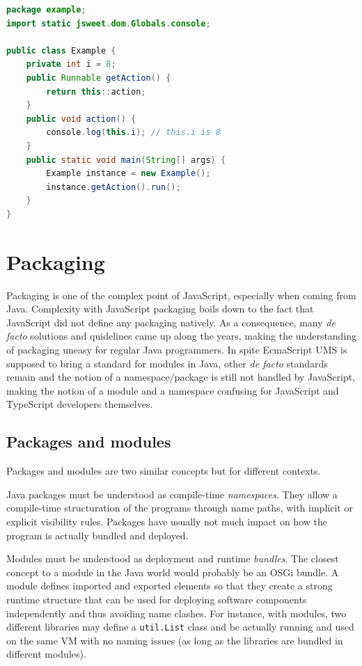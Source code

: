 \documentclass[a4paper]{report}
\begin{document}
\begin{lstlisting}[language=Java]
package example;
import static jsweet.dom.Globals.console;

public class Example {
	private int i = 8;
	public Runnable getAction() {
		return this::action;
	}
	public void action() {
		console.log(this.i); // this.i is 8
	}
	public static void main(String[] args) {
		Example instance = new Example();
		instance.getAction().run();
	}
}
\end{lstlisting}

\chapter{Packaging}
\label{packaging}

Packaging is one of the complex point of JavaScript, especially when coming from Java. Complexity with JavaScript packaging boils down to the fact that JavaScript did not define any packaging natively. As a consequence, many \emph{de facto} solutions and quidelines came up along the years, making the understanding of packaging uneasy for regular Java programmers. In spite EcmaScript UMS is supposed to bring a standard for modules in Java, other \emph{de facto} standards remain and the notion of a namespace/package is still not handled by JavaScript, making the notion of a module and a namespace confusing for JavaScript and TypeScript developers themselves.

\section{Packages and modules}

Packages and modules are two similar concepts but for different contexts.

Java packages must be understood as compile-time \emph{namespaces}. They allow a compile-time structuration of the programs through name paths, with implicit or explicit visibility rules. Packages have usually not much impact on how the program is actually bundled and deployed.

Modules must be understood as deployment and runtime \emph{bundles}. The closest concept to a module in the Java world would probably be an OSGi bundle. A module defines imported and exported elements so that they create a strong runtime structure that can be used for deploying software components independently and thus avoiding name clashes. For instance, with modules, two different libraries may define a \texttt{util.List} class and be actually running and used on the same VM with no naming issues (as long as the libraries are bundled in different modules).
\end{document}

